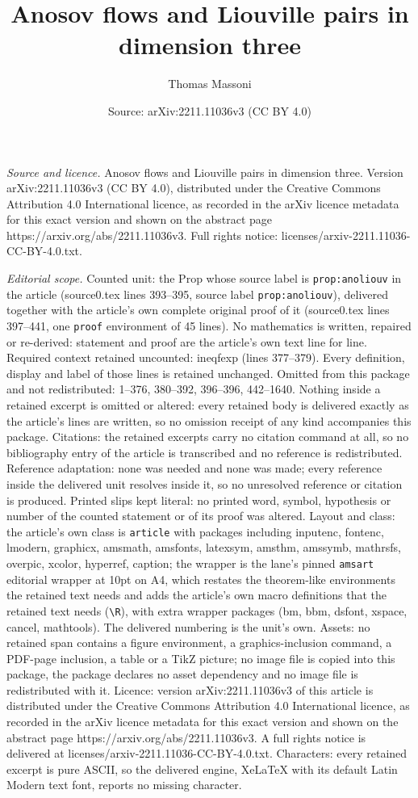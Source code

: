 \documentclass[10pt,a4paper]{amsart}
\title[Anosov flows and Liouville pairs in dimension three]{Anosov flows and Liouville pairs in dimension three}
\author{Thomas Massoni}
\date{Source: arXiv:2211.11036v3 (CC BY 4.0)}
\begin{document}
\maketitle

\noindent\emph{Source and licence.} Anosov flows and Liouville pairs in dimension three. Version arXiv:2211.11036v3 (CC BY 4.0), distributed under the Creative Commons Attribution 4.0 International licence, as recorded in the arXiv licence metadata for this exact version and shown on the abstract page https://arxiv.org/abs/2211.11036v3. Full rights notice: licenses/arxiv-2211.11036-CC-BY-4.0.txt.\par\smallskip

\noindent\textit{Editorial scope.} Counted unit: the Prop whose source label is \texttt{prop:anoliouv} in the article (source0.tex lines 393--395, source label \texttt{prop:anoliouv}), delivered together with the article's own complete original proof of it (source0.tex lines 397--441, one \texttt{proof} environment of 45 lines). No mathematics is written, repaired or re-derived: statement and proof are the article's own text line for line. Required context retained uncounted: ineqfexp (lines 377--379). Every definition, display and label of those lines is retained unchanged. Omitted from this package and not redistributed: 1--376, 380--392, 396--396, 442--1640. Nothing inside a retained excerpt is omitted or altered: every retained body is delivered exactly as the article's lines are written, so no omission receipt of any kind accompanies this package. Citations: the retained excerpts carry no citation command at all, so no bibliography entry of the article is transcribed and no reference is redistributed. Reference adaptation: none was needed and none was made; every reference inside the delivered unit resolves inside it, so no unresolved reference or citation is produced. Printed slips kept literal: no printed word, symbol, hypothesis or number of the counted statement or of its proof was altered. Layout and class: the article's own class is \texttt{article} with packages including inputenc, fontenc, lmodern, graphicx, amsmath, amsfonts, latexsym, amsthm, amssymb, mathrsfs, overpic, xcolor, hyperref, caption; the wrapper is the lane's pinned \texttt{amsart} editorial wrapper at 10pt on A4, which restates the theorem-like environments the retained text needs and adds the article's own macro definitions that the retained text needs (\texttt{\textbackslash R}), with extra wrapper packages (bm, bbm, dsfont, xspace, cancel, mathtools). The delivered numbering is the unit's own. Assets: no retained span contains a figure environment, a graphics-inclusion command, a PDF-page inclusion, a table or a TikZ picture; no image file is copied into this package, the package declares no asset dependency and no image file is redistributed with it. Licence: version arXiv:2211.11036v3 of this article is distributed under the Creative Commons Attribution 4.0 International licence, as recorded in the arXiv licence metadata for this exact version and shown on the abstract page https://arxiv.org/abs/2211.11036v3. A full rights notice is delivered at licenses/arxiv-2211.11036-CC-BY-4.0.txt. Characters: every retained excerpt is pure ASCII, so the delivered engine, XeLaTeX with its default Latin Modern text font, reports no missing character.
\end{document}
